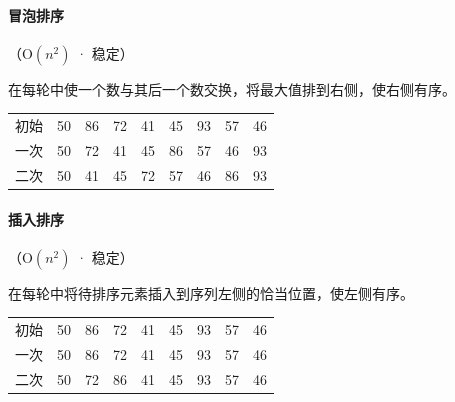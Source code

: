 \documentclass[UTF8]{ctexart}
\renewcommand\O{\mathrm{O}}
\begin{document}
\newcommand\sort[1]{\colorbox{color1b}{\textcolor{color1}{#1}}}

\paragraph{\textcolor{color1}{冒泡排序}} {\small\textcolor{color1}{（$\O(n^2)$ · 稳定）}}

在每轮中使一个数与其后一个数交换，将最大值排到右侧，使右侧有序。

\begin{table}[H]
  \centering
  \begin{tabular}{ccccccccc}
    初始 & 50 & 86 & 72 & 41 & 45 & 93 & 57 & 46 \\
    一次 & 50 & 72 & 41 & 45 & 86 & 57 & 46 & \sort{93} \\
    二次 & 50 & 41 & 45 & 72 & 57 & 46 & \sort{86} & \sort{93} \\
  \end{tabular}
\end{table}

\vspace{-2em}

\paragraph{\textcolor{color1}{插入排序}} {\small\textcolor{color1}{（$\O(n^2)$ · 稳定）}}

在每轮中将待排序元素插入到序列左侧的恰当位置，使左侧有序。

\begin{table}[H]
  \centering
  \begin{tabular}{ccccccccc}
    初始 & \sort{50} & 86 & 72 & 41 & 45 & 93 & 57 & 46 \\
    一次 & \sort{50} & \sort{86} & 72 & 41 & 45 & 93 & 57 & 46  \\
    二次 & \sort{50} & \sort{72} & \sort{86} & 41 & 45 & 93 & 57 & 46 \\
  \end{tabular}
\end{table}
\end{document}
